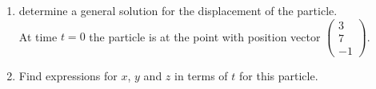 \documentclass[leqno]{article}
\begin{document}
\begin{enumerate}[
  label=\textbf{\arabic*.},
  leftmargin=*,
  topsep=0pt,
  partopsep=0pt,
  parsep=0pt
]
\begin{enumerate}[label=\textbf{(\alph*)}]
\begin{enumerate}[label=(\roman*)]
    \[\begin{pmatrix} u \\ v \\ w \end{pmatrix} = \mathbf{P}^{-1} \begin{pmatrix} x \\ y \\ z \end{pmatrix} \quad \text{so that} \quad \begin{pmatrix} \dot{u} \\ \dot{v} \\ \dot{w} \end{pmatrix} = \mathbf{P}^{-1} \begin{pmatrix} \dot{x} \\ \dot{y} \\ \dot{z} \end{pmatrix}\]
    \item determine a general solution for the displacement of the particle.  \\
    At time $t = 0$ the particle is at the point with position vector $\begin{pmatrix} 3 \\ 7 \\ -1 \end{pmatrix}$. \\
    \item Find expressions for $x$, $y$ and $z$ in terms of $t$ for this particle.  \\
  \end{enumerate}
\end{enumerate}

\end{enumerate}
\end{document}
